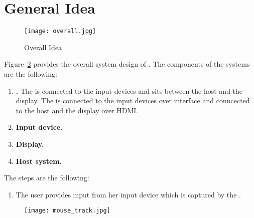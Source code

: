 \section{General Idea}

\begin{figure}
\centering
\texttt{[image: overall.jpg]}
\caption{Overall Idea}
\label{fig:overallIdea}
\centering
\end{figure}


Figure~\ref{fig:overallIdea} provides the overall system design of \name. The components of the systems are the following:

\begin{enumerate}
  \item \textbf{\device.} The \device is connected to the input devices and sits between the host and the display. The \device is connected to the input devices over \usb interface and conncected to the host and the display over HDMI.
  \item \textbf{Input device.}
  \item \textbf{Display.}
  \item \textbf{Host system.}
\end{enumerate}

The steps are the following:

\begin{enumerate}
  \item The user provides input from her input device which is captured by the \device.
\end{enumerate}


\begin{figure}
\centering
\texttt{[image: mouse\_track.jpg]}
\caption{}
\label{fig:overallIdea}
\centering
\end{figure}

